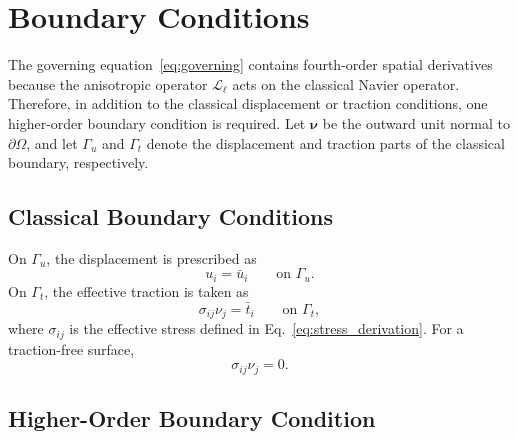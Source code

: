 \documentclass[final,3p,times,fleqn]{elsarticle}
\begin{document}
\section{Boundary Conditions}
\label{sec:boundary_conditions}

The governing equation~\eqref{eq:governing} contains fourth-order
spatial derivatives because the anisotropic operator
$\mathcal{L}_{\ell}$ acts on the classical Navier operator. Therefore,
in addition to the classical displacement or traction conditions, one
higher-order boundary condition is required. Let $\boldsymbol{\nu}$ be
the outward unit normal to $\partial\Omega$, and let
$\Gamma_u$ and $\Gamma_t$ denote the displacement and traction parts of
the classical boundary, respectively.

\subsection{Classical Boundary Conditions}

On $\Gamma_u$, the displacement is prescribed as
\begin{equation}\label{eq:essential_BC}
u_i=\bar{u}_i
\qquad
\text{on } \Gamma_u .
\end{equation}
On $\Gamma_t$, the effective traction is taken as
\begin{equation}\label{eq:traction_BC}
\sigma_{ij}\nu_j=\bar{t}_i
\qquad
\text{on } \Gamma_t ,
\end{equation}
where $\sigma_{ij}$ is the effective stress defined in
Eq.~\eqref{eq:stress_derivation}. For a traction-free surface,
\begin{equation}\label{eq:free_traction}
\sigma_{ij}\nu_j=0 .
\end{equation}

\subsection{Higher-Order Boundary Condition}
\end{document}
